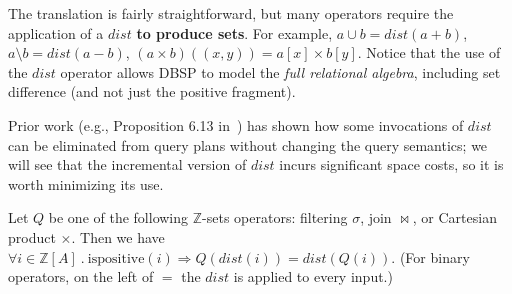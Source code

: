 \documentclass[twocolumn
]{svjour3}
\numberwithin{equation}{section}
\newcommand{\dbsp}{DBSP\xspace}
\newcommand{\zrs}{$\Z$-sets\xspace} %
\newcommand{\Z}{\mathbb{Z}}  %
\newcommand{\distinct}{\mathit{dist}}  %
\newcommand{\ispositive}{\mbox{ispositive}}
\newcommand{\defn}{\stackrel{\textrm{\scriptsize def}}{=}}
\begin{document}
The translation is fairly straightforward, but many operators require
the application of a $\distinct$ \textbf{to produce sets}.
For example, $a \cup b = \distinct(a + b)$, $a \setminus b =
\distinct(a - b)$, $(a \times b)((x,y)) = a[x] \times b[y]$.
%
%
%
%
%
%
%
Notice that the use of the $\distinct$ operator allows \dbsp to model
the \emph{full relational algebra}, including set difference (and not
just the positive fragment).

Prior work (e.g., Proposition 6.13 in~\cite{green-tcs11}) has shown
how some invocations of $\distinct$ can be eliminated from query plans
without changing the query semantics; we will see that the incremental
version of $\distinct$ incurs significant space costs, so it is worth
minimizing its use.

\begin{proposition}\label{prop-distinct-delay}
Let $Q$ be one of the following \zrs operators: filtering $\sigma$,
join $\bowtie$, or Cartesian product $\times$.  Then we have $\forall
i \in \Z[A]~.~\ispositive(i) \Rightarrow Q(\distinct(i)) =
\distinct(Q(i))$.  (For binary operators, on the left of $=$ the
$\distinct$ is applied to every input.)
\end{proposition}
\end{document}
